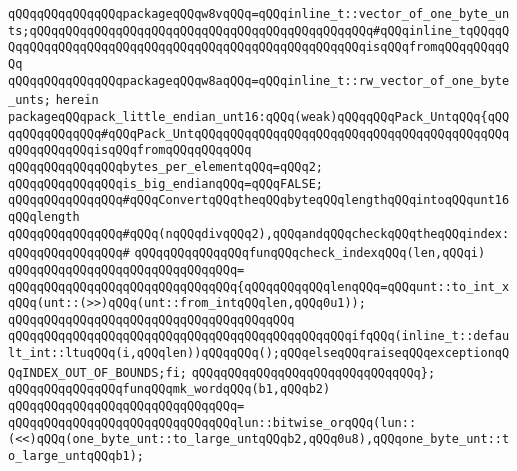 \verb|qQQqqQQqqQQqqQQqpackageqQQqw8vqQQq=qQQqinline_t::vector_of_one_byte_unts;qQQqqQQqqQQqqQQqqQQqqQQqqQQqqQQqqQQqqQQqqQQqqQQq#qQQqinline_tqQQqqQQqqQQqqQQqqQQqqQQqqQQqqQQqqQQqqQQqqQQqqQQqqQQqqQQqisqQQqfromqQQqqQQqqQQq|\newline
\verb|qQQqqQQqqQQqqQQqpackageqQQqw8aqQQq=qQQqinline_t::rw_vector_of_one_byte_unts;|\newline
\verb|herein|\newline
\verb|packageqQQqpack_little_endian_unt16:qQQq(weak)qQQqqQQqPack_UntqQQq{qQQqqQQqqQQqqQQq#qQQqPack_UntqQQqqQQqqQQqqQQqqQQqqQQqqQQqqQQqqQQqqQQqqQQqqQQqqQQqqQQqisqQQqfromqQQqqQQqqQQq|\newline
\newline
\verb|qQQqqQQqqQQqqQQqbytes_per_elementqQQq=qQQq2;|\newline
\verb|qQQqqQQqqQQqqQQqis_big_endianqQQq=qQQqFALSE;|\newline
\newline
\verb|qQQqqQQqqQQqqQQq#qQQqConvertqQQqtheqQQqbyteqQQqlengthqQQqintoqQQqunt16qQQqlength|\newline
\verb|qQQqqQQqqQQqqQQq#qQQq(nqQQqdivqQQq2),qQQqandqQQqcheckqQQqtheqQQqindex:|\newline
\verb|qQQqqQQqqQQqqQQq#|\newline
\verb|qQQqqQQqqQQqqQQqfunqQQqcheck_indexqQQq(len,qQQqi)|\newline
\verb|qQQqqQQqqQQqqQQqqQQqqQQqqQQqqQQq=|\newline
\verb|qQQqqQQqqQQqqQQqqQQqqQQqqQQqqQQq{qQQqqQQqqQQqlenqQQq=qQQqunt::to_int_xqQQq(unt::(>>)qQQq(unt::from_intqQQqlen,qQQq0u1));|\newline
\verb|qQQqqQQqqQQqqQQqqQQqqQQqqQQqqQQqqQQqqQQq|\newline
\verb|qQQqqQQqqQQqqQQqqQQqqQQqqQQqqQQqqQQqqQQqqQQqqQQqifqQQq(inline_t::default_int::ltuqQQq(i,qQQqlen))qQQqqQQq();qQQqelseqQQqraiseqQQqexceptionqQQqINDEX_OUT_OF_BOUNDS;fi;|\newline
\verb|qQQqqQQqqQQqqQQqqQQqqQQqqQQqqQQq};|\newline
\newline
\verb|qQQqqQQqqQQqqQQqfunqQQqmk_wordqQQq(b1,qQQqb2)|\newline
\verb|qQQqqQQqqQQqqQQqqQQqqQQqqQQqqQQq=|\newline
\verb|qQQqqQQqqQQqqQQqqQQqqQQqqQQqqQQqlun::bitwise_orqQQq(lun::(<<)qQQq(one_byte_unt::to_large_untqQQqb2,qQQq0u8),qQQqone_byte_unt::to_large_untqQQqb1);|\newline
